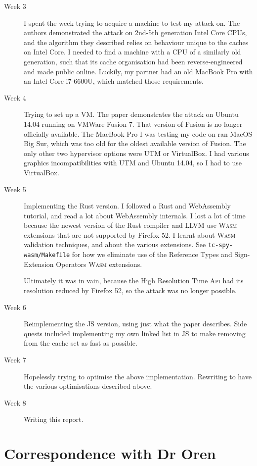\documentclass[a4paper,10pt,twocolumn]{article}
\theoremstyle{definition}
\newcommand*{\code}{\texttt}
\newcommand*{\acronym}{\textsc}
\newcommand*{\API}{\acronym{Api}}
\newcommand*{\WASM}{\acronym{Wasm}}
\begin{document}
\begin{description}
\item[Week 3]
  I spent the week trying to acquire a machine to test my attack on.
  The authors demonstrated the attack on 2nd-5th generation Intel Core
  CPUs, and the algorithm they described relies on behaviour unique to the
  caches on Intel Core.
  I needed to find a machine with a CPU of a similarly old generation, such that
  its cache organisation had been reverse-engineered and made public online.
  Luckily, my partner had an old MacBook Pro with an Intel Core i7-6600U, which
  matched those requirements.
\item[Week 4]
  Trying to set up a VM.
  The paper demonstrates the attack on Ubuntu 14.04 running on VMWare Fusion 7.
  That version of Fusion is no longer officially available.
  The MacBook Pro I was testing my code on ran MacOS Big Sur, which was too old
  for the oldest available version of Fusion.
  The only other two hypervisor options were UTM or VirtualBox.
  I had various graphics incompatibilities with UTM and Ubuntu 14.04, so I had
  to use VirtualBox.
\item[Week 5]
  Implementing the Rust version.
  I followed a Rust and WebAssembly tutorial, and read a lot about WebAssembly
  internals.
  I lost a lot of time because the newest version of the Rust compiler and LLVM
  use \WASM{} extensions that are not supported by Firefox 52.
  I learnt about \WASM{} validation techniques, and about the various
  extensions.
  See \code{tc-spy-wasm/Makefile} for how we eliminate use of the Reference
  Types and Sign-Extension Operators \WASM{} extensions.

  Ultimately it was in vain, because the High Resolution Time \API{} had its
  resolution reduced by Firefox 52, so the attack was no longer possible.
\item[Week 6]
  Reimplementing the JS version, using just what the paper describes.
  Side quests included implementing my own linked list in JS to make removing
  from the cache set as fast as possible.
\item [Week 7]
  Hopelessly trying to optimise the above implementation.
  Rewriting to have the various optimisations described above.
\item [Week 8]
  Writing this report.
\end{description}

\newpage
\onecolumn
\section{Correspondence with Dr Oren}
\end{document}
